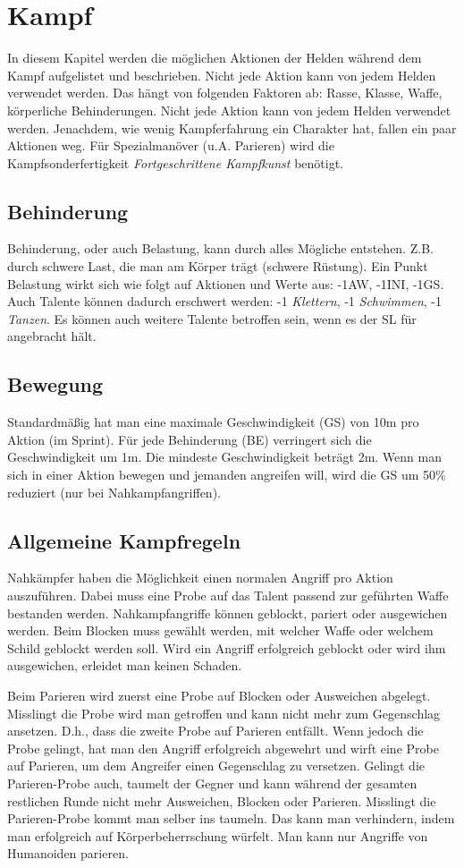{\let\clearpage\relax\chapter{Kampf}}
In diesem Kapitel werden die möglichen Aktionen der Helden während dem Kampf aufgelistet und beschrieben. Nicht jede Aktion kann von jedem Helden verwendet werden. Das hängt von folgenden Faktoren ab: Rasse, Klasse, Waffe, körperliche Behinderungen. Nicht jede Aktion kann von jedem Helden verwendet werden. Jenachdem, wie wenig Kampferfahrung ein Charakter hat, fallen ein paar Aktionen weg. Für Spezialmanöver (u.A. Parieren) wird die Kampfsonderfertigkeit \textit{Fortgeschrittene Kampfkunst} benötigt.

\section{Behinderung}
Behinderung, oder auch Belastung, kann durch alles Mögliche entstehen. Z.B. durch schwere Last, die man am Körper trägt (schwere Rüstung). Ein Punkt Belastung wirkt sich wie folgt auf Aktionen und Werte aus: -1AW, -1INI, -1GS. Auch Talente können dadurch erschwert werden: -1 \textit{Klettern}, -1 \textit{Schwimmen}, -1 \textit{Tanzen}. Es können auch weitere Talente betroffen sein, wenn es der SL für angebracht hält.

\section{Bewegung}
Standardmäßig hat man eine maximale Geschwindigkeit (GS) von 10m pro Aktion (im Sprint). Für jede Behinderung (BE) verringert sich die Geschwindigkeit um 1m. Die mindeste Geschwindigkeit beträgt 2m. Wenn man sich in einer Aktion bewegen und jemanden angreifen will, wird die GS um 50\% reduziert (nur bei Nahkampfangriffen). 

\section{Allgemeine Kampfregeln}
Nahkämpfer haben die Möglichkeit einen normalen Angriff pro Aktion auszuführen. Dabei muss eine Probe auf das Talent passend zur geführten Waffe bestanden werden. Nahkampfangriffe können geblockt, pariert oder ausgewichen werden. Beim Blocken muss gewählt werden, mit welcher Waffe oder welchem Schild geblockt werden soll. Wird ein Angriff erfolgreich geblockt oder wird ihm ausgewichen, erleidet man keinen Schaden. 

Beim Parieren wird zuerst eine Probe auf Blocken oder Ausweichen abgelegt. Misslingt die Probe wird man getroffen und kann nicht mehr zum Gegenschlag ansetzen. D.h., dass die zweite Probe auf Parieren entfällt. Wenn jedoch die Probe gelingt, hat man den Angriff erfolgreich abgewehrt und wirft eine Probe auf Parieren, um dem Angreifer einen Gegenschlag zu versetzen. Gelingt die Parieren-Probe auch, taumelt der Gegner und kann während der gesamten restlichen Runde nicht mehr Ausweichen, Blocken oder Parieren. Misslingt die Parieren-Probe kommt man selber ins taumeln. Das kann man verhindern, indem man erfolgreich auf Körperbeherrschung würfelt. Man kann nur Angriffe von Humanoiden parieren.

